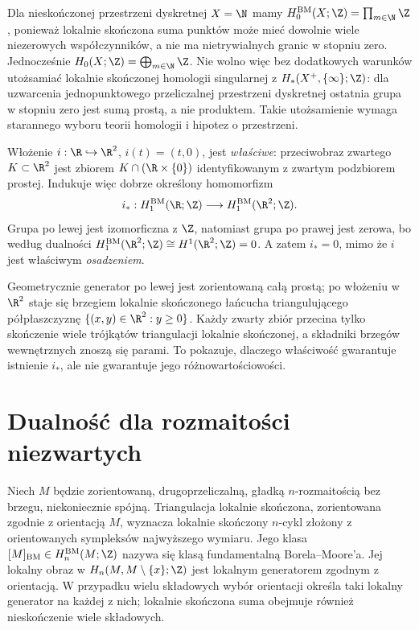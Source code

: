 \begin{przyklad}
Dla nieskończonej przestrzeni dyskretnej $X=\N$
mamy $H_0^{\mathrm{BM}}(X;\Z)=\prod_{m\in\N}\Z$,
ponieważ lokalnie skończona suma punktów może mieć
dowolnie wiele niezerowych współczynników, a nie
ma nietrywialnych granic w stopniu zero.
Jednocześnie $H_0(X;\Z)=\bigoplus_{m\in\N}\Z$.
Nie wolno więc bez dodatkowych warunków utożsamiać
lokalnie skończonej homologii singularnej z
$H_*(X^+,\{\infty\};\Z)$: dla uzwarcenia
jednopunktowego przeliczalnej przestrzeni dyskretnej
ostatnia grupa w stopniu zero jest sumą prostą,
a nie produktem. Takie utożsamienie wymaga starannego
wyboru teorii homologii i hipotez o przestrzeni.
\end{przyklad}

\begin{przyklad}
\label{prz:BM-proper-inclusion-line}
Włożenie $i:\R\hookrightarrow\R^2$,
$i(t)=(t,0)$, jest \emph{właściwe}:
przeciwobraz zwartego $K\subset\R^2$
jest zbiorem $K\cap(\R\times\{0\})$
identyfikowanym z zwartym podzbiorem prostej.
Indukuje więc dobrze określony homomorfizm
\[
 i_*:H_1^{\mathrm{BM}}(\R;\Z)\longrightarrow
      H_1^{\mathrm{BM}}(\R^2;\Z).
\]
Grupa po lewej jest izomorficzna z $\Z$,
natomiast grupa po prawej jest zerowa,
bo według dualności
$H_1^{\mathrm{BM}}(\R^2;\Z)
\cong H^1(\R^2;\Z)=0$.
A zatem $i_*=0$, mimo że $i$ jest
właściwym \emph{osadzeniem}.

Geometrycznie generator po lewej jest
zorientowaną całą prostą; po włożeniu
w $\R^2$ staje się brzegiem
lokalnie skończonego łańcucha
triangulującego półpłaszczyznę
$\{(x,y)\in\R^2:y\ge0\}$.
Każdy zwarty zbiór przecina tylko skończenie
wiele trójkątów triangulacji lokalnie skończonej,
a składniki brzegów wewnętrznych znoszą się parami.
To pokazuje, dlaczego właściwość
gwarantuje istnienie $i_*$,
ale nie gwarantuje jego różnowartościowości.
\end{przyklad}

\section{Dualność dla rozmaitości niezwartych}
\begin{definicja}
Niech $M$ będzie zorientowaną, drugoprzeliczalną,
gładką $n$-rozmaitością bez brzegu, niekoniecznie spójną.
Triangulacja lokalnie
skończona, zorientowana zgodnie z orientacją $M$,
wyznacza lokalnie skończony $n$-cykl złożony z
orientowanych sympleksów najwyższego wymiaru.
Jego klasa $[M]_{\mathrm{BM}}\in H_n^{\mathrm{BM}}(M;\Z)$
nazywa się klasą fundamentalną Borela--Moore'a.
Jej lokalny obraz w $H_n(M,M\setminus\{x\};\Z)$
jest lokalnym generatorem zgodnym z orientacją.
W przypadku wielu składowych wybór orientacji
określa taki lokalny generator na każdej z nich;
lokalnie skończona suma obejmuje również
nieskończenie wiele składowych.
\end{definicja}

